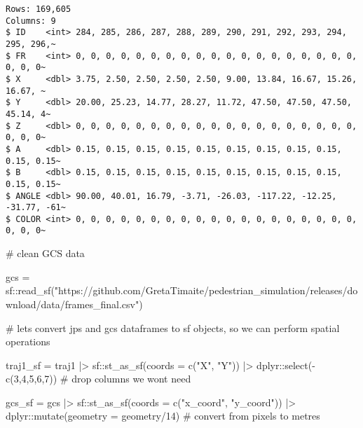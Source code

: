 \documentclass[
  letterpaper,
  DIV=11,
  numbers=noendperiod]{scrreprt}
\newenvironment{Shaded}{\begin{snugshade}}{\end{snugshade}}
\newcommand{\AttributeTok}[1]{\textcolor[rgb]{0.40,0.45,0.13}{#1}}
\newcommand{\CommentTok}[1]{\textcolor[rgb]{0.37,0.37,0.37}{#1}}
\newcommand{\DecValTok}[1]{\textcolor[rgb]{0.68,0.00,0.00}{#1}}
\newcommand{\FunctionTok}[1]{\textcolor[rgb]{0.28,0.35,0.67}{#1}}
\newcommand{\NormalTok}[1]{\textcolor[rgb]{0.00,0.23,0.31}{#1}}
\newcommand{\OtherTok}[1]{\textcolor[rgb]{0.00,0.23,0.31}{#1}}
\newcommand{\SpecialCharTok}[1]{\textcolor[rgb]{0.37,0.37,0.37}{#1}}
\newcommand{\StringTok}[1]{\textcolor[rgb]{0.13,0.47,0.30}{#1}}
\begin{document}
\begin{verbatim}
Rows: 169,605
Columns: 9
$ ID    <int> 284, 285, 286, 287, 288, 289, 290, 291, 292, 293, 294, 295, 296,~
$ FR    <int> 0, 0, 0, 0, 0, 0, 0, 0, 0, 0, 0, 0, 0, 0, 0, 0, 0, 0, 0, 0, 0, 0~
$ X     <dbl> 3.75, 2.50, 2.50, 2.50, 2.50, 9.00, 13.84, 16.67, 15.26, 16.67, ~
$ Y     <dbl> 20.00, 25.23, 14.77, 28.27, 11.72, 47.50, 47.50, 47.50, 45.14, 4~
$ Z     <dbl> 0, 0, 0, 0, 0, 0, 0, 0, 0, 0, 0, 0, 0, 0, 0, 0, 0, 0, 0, 0, 0, 0~
$ A     <dbl> 0.15, 0.15, 0.15, 0.15, 0.15, 0.15, 0.15, 0.15, 0.15, 0.15, 0.15~
$ B     <dbl> 0.15, 0.15, 0.15, 0.15, 0.15, 0.15, 0.15, 0.15, 0.15, 0.15, 0.15~
$ ANGLE <dbl> 90.00, 40.01, 16.79, -3.71, -26.03, -117.22, -12.25, -31.77, -61~
$ COLOR <int> 0, 0, 0, 0, 0, 0, 0, 0, 0, 0, 0, 0, 0, 0, 0, 0, 0, 0, 0, 0, 0, 0~
\end{verbatim}

\begin{Shaded}
\begin{Highlighting}[]
\CommentTok{\# clean GCS data}

\NormalTok{gcs }\OtherTok{=}\NormalTok{ sf}\SpecialCharTok{::}\FunctionTok{read\_sf}\NormalTok{(}\StringTok{"https://github.com/GretaTimaite/pedestrian\_simulation/releases/download/data/frames\_final.csv"}\NormalTok{)}
\end{Highlighting}
\end{Shaded}

\begin{Shaded}
\begin{Highlighting}[]
\CommentTok{\# let\textquotesingle{}s convert jps and gcs dataframes to sf objects, so we can perform spatial operations}

\NormalTok{traj1\_sf }\OtherTok{=}\NormalTok{ traj1 }\SpecialCharTok{|\textgreater{}} 
\NormalTok{  sf}\SpecialCharTok{::}\FunctionTok{st\_as\_sf}\NormalTok{(}\AttributeTok{coords =} \FunctionTok{c}\NormalTok{(}\StringTok{"X"}\NormalTok{, }\StringTok{"Y"}\NormalTok{)) }\SpecialCharTok{|\textgreater{}} 
\NormalTok{  dplyr}\SpecialCharTok{::}\FunctionTok{select}\NormalTok{(}\SpecialCharTok{{-}}\FunctionTok{c}\NormalTok{(}\DecValTok{3}\NormalTok{,}\DecValTok{4}\NormalTok{,}\DecValTok{5}\NormalTok{,}\DecValTok{6}\NormalTok{,}\DecValTok{7}\NormalTok{)) }\CommentTok{\# drop columns we won\textquotesingle{}t need}

\NormalTok{gcs\_sf }\OtherTok{=}\NormalTok{ gcs }\SpecialCharTok{|\textgreater{}} 
\NormalTok{  sf}\SpecialCharTok{::}\FunctionTok{st\_as\_sf}\NormalTok{(}\AttributeTok{coords =} \FunctionTok{c}\NormalTok{(}\StringTok{"x\_coord"}\NormalTok{, }\StringTok{"y\_coord"}\NormalTok{)) }\SpecialCharTok{|\textgreater{}} 
\NormalTok{  dplyr}\SpecialCharTok{::}\FunctionTok{mutate}\NormalTok{(}\AttributeTok{geometry =}\NormalTok{ geometry}\SpecialCharTok{/}\DecValTok{14}\NormalTok{) }\CommentTok{\# convert from pixels to metres}
\end{Highlighting}
\end{Shaded}
\end{document}
